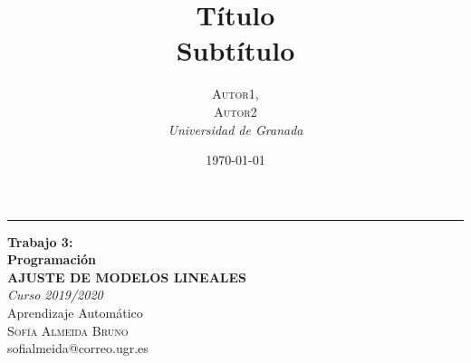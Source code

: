 \documentclass[a4paper, 20pt]{article}
\title{\textbf{Título}\\ %
Subtítulo} %
\author{\textsc{Autor1,\\Autor2} %
\\{\textit{Universidad de Granada}}} %
\date{\today} %
\begin{document}

\begin{titlepage} %
	
	\raggedleft %
	
	\rule{1pt}{\textheight} %
	\hspace{0.05\textwidth} %
	\parbox[b]{0.8\textwidth}{ %
		
		{\Huge\bfseries Trabajo 3:\\[0.5\baselineskip] Programación\\[0.5\baselineskip]\large AJUSTE DE MODELOS LINEALES\\[2\baselineskip]} %
		{\large\textit{Curso 2019/2020}\\[0.5\baselineskip]Aprendizaje Automático\\[1.5\baselineskip] }%
		{\Large\textsc{Sofía Almeida Bruno}\\[0.5\baselineskip]sofialmeida@correo.ugr.es} %
		
		\vspace{0.4\textheight} %
		
		{\noindent \\[0.5\baselineskip] }\\[\baselineskip] %
	}

\end{titlepage}


\end{document}

